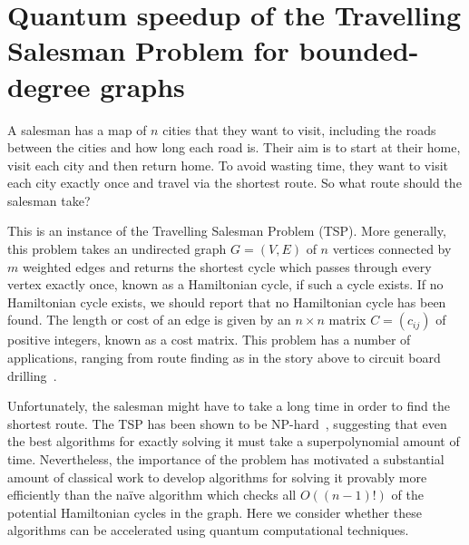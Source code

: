 \chapter{Quantum speedup of the Travelling Salesman Problem for bounded-degree graphs}

A salesman has a map of $n$ cities that they want to visit, including the roads between the cities and how long each road is. Their aim is to start at their home, visit each city and then return home. To avoid wasting time, they want to visit each city exactly once and travel via the shortest route. So what route should the salesman take?

This is an instance of the Travelling Salesman Problem (TSP). More generally, this problem takes an undirected graph $G = (V, E)$ of $n$ vertices connected by $m$ weighted edges and returns the shortest cycle which passes through every vertex exactly once, known as a Hamiltonian cycle, if such a cycle exists. If no Hamiltonian cycle exists, we should report that no Hamiltonian cycle has been found. The length or cost of an edge is given by an $n \times n$ matrix $C = (c_{ij})$ of positive integers, known as a cost matrix. This problem has a number of applications, ranging from route finding as in the story above to circuit board drilling~\cite{grotschel1991}.

Unfortunately, the salesman might have to take a long time in order to find the shortest route. The TSP has been shown to be NP-hard~\cite[Chapter $3$]{lawler1985}, suggesting that even the best algorithms for exactly solving it must take a superpolynomial amount of time. Nevertheless, the importance of the problem has motivated a substantial amount of classical work to develop algorithms for solving it provably more efficiently than the na\"ive algorithm which checks all $O((n-1)!)$ of the potential Hamiltonian cycles in the graph. Here we consider whether these algorithms can be accelerated using quantum computational techniques.

